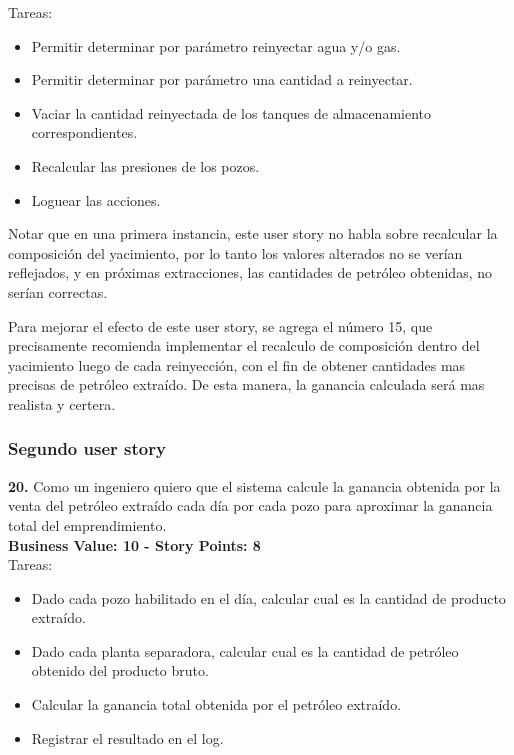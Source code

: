 Tareas:

\begin{itemize}
    \item Permitir determinar por parámetro reinyectar agua y/o gas.
    \item Permitir determinar por parámetro una cantidad a reinyectar.
    \item Vaciar la cantidad reinyectada de los tanques de almacenamiento correspondientes.
    \item Recalcular las presiones de los pozos.
    \item Loguear las acciones.
\end{itemize}

Notar que en una primera instancia, este user story no habla sobre recalcular la composición del yacimiento, por lo tanto los valores alterados no se verían reflejados, y en próximas extracciones, las cantidades de petróleo obtenidas, no serían correctas.

Para mejorar el efecto de este user story, se agrega el número 15, que precisamente recomienda implementar el recalculo de composición dentro del yacimiento luego de cada reinyección, con el fin de obtener cantidades mas precisas de petróleo extraído. De esta manera, la ganancia calculada será mas realista y certera.

\subsubsection{Segundo user story}

\textbf{20.} Como un ingeniero quiero que el sistema calcule la ganancia obtenida por la venta del petróleo extraído cada día por cada pozo para aproximar la ganancia total del emprendimiento.\\
\textbf{Business Value: 10 - Story Points: 8}\\

Tareas:

\begin{itemize}
    \item Dado cada pozo habilitado en el día, calcular cual es la cantidad de producto extraído.
    \item Dado cada planta separadora, calcular cual es la cantidad de petróleo obtenido del producto bruto.
    \item Calcular la ganancia total obtenida por el petróleo extraído.
    \item Registrar el resultado en el log.
\end{itemize}

